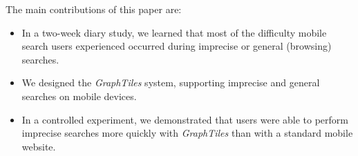 The main contributions of this paper are:
\begin{itemize}
\item In a two-week diary study, we learned that most of the difficulty mobile search users experienced occurred during imprecise or general (browsing) searches.  
\item We designed the \textit{GraphTiles} system, supporting imprecise and general searches on mobile devices.
\item In a controlled experiment, we demonstrated that users were able to perform imprecise searches more quickly with \textit{GraphTiles} than with a standard mobile website.
\end{itemize}


